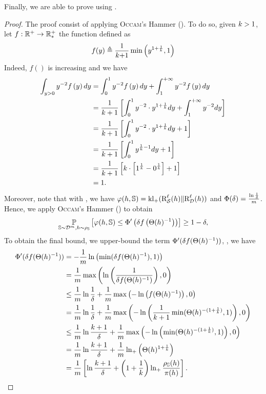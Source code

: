 \begin{noaddcontents}
Finally, we are able to prove  using .

\disintegratedblanchard*
\begin{proof}
The proof consist of applying \textsc{Occam}'s Hammer ().
To do so, given $k>1$, let $f: \mathbb{R}^{+} \to \mathbb{R}^{+}_{*}$ the function defined as
\begin{align*}
    f(y) \triangleq \frac{1}{k{+}1}\min\left( y^{1+\frac{1}{k}}, 1\right)
\end{align*}
Indeed, $f()$ is increasing and we have
\begin{align*}
\int_{y>0}y^{-2}f\left( y\right) dy &= \int_{0}^{1}y^{-2}f\left( y\right) dy + \int_{1}^{+\infty}y^{-2}f\left( y\right) dy\\
&= \frac{1}{k+1}\left[ \int_{0}^{1}y^{-2}\cdot y^{1+\frac{1}{k}} dy + \int_{1}^{+\infty} y^{-2}dy \right]\\
&= \frac{1}{k+1}\left[ \int_{0}^{1}y^{-2}\cdot y^{1+\frac{1}{k}} dy + 1 \right]\\
&= \frac{1}{k+1}\left[ \int_{0}^{1} y^{\frac{1}{k}-1} dy + 1 \right]\\
&= \frac{1}{k+1}\left[ k\cdot\left[1^{\frac{1}{k}}-0^{\frac{1}{k}}\right] + 1 \right]\\
&= 1.
\end{align*}
Moreover, note that with , we have $\varphi(h,\mathbb{S})=\operatorname{kl}_{+}(\text{R}^{\ell}_{\mathcal{S}}(h)\|\text{R}^{\ell}_{\mathcal{D}}(h))$ and $\Phi(\delta) = \frac{\ln\frac{1}{\delta}}{m}$.
Hence, we apply \textsc{Occam}'s Hammer () to obtain
    \begin{align*}
    \operatorname*{\mathbb{P}}_{\mathbb{S}\sim\mathcal{D}^m,h\sim\rho_{\mathbb{S}}}\left[ \varphi(h,\mathbb{S}) \le \Phi'\left(\delta f\left(\Theta(h)^{-1}\right)\right) \right] \ge 1-\delta,
\end{align*}
To obtain the final bound, we upper-bound the term $\Phi'(\delta f(\Theta(h)^{-1}))$, \ie, we have 
\begingroup
\allowdisplaybreaks
\begin{align*}
    \Phi'(\delta f(\Theta(h)^{-1})) &= -\frac{1}{m}\ln\left( \min(\delta f(\Theta(h)^{-1}), 1)\right)\\
    &= \frac{1}{m}\max\left(\ln\left(\frac{1}{\delta f(\Theta(h)^{-1})}\right), 0\right)\\
    &\le \frac{1}{m}\ln\frac{1}{\delta}+\frac{1}{m}\max\left( -\ln\left( f(\Theta(h)^{-1})\right), 0\right)\\
    &= \frac{1}{m}\ln\frac{1}{\delta}+\frac{1}{m}\max\left( -\ln\left( \frac{1}{k+1}\min(\Theta(h)^{-(1+\frac{1}{k})}, 1)\right), 0\right)\\
    &\le \frac{1}{m}\ln\frac{k+1}{\delta}+\frac{1}{m}\max\left( -\ln\left( \min(\Theta(h)^{-(1+\frac{1}{k})}, 1)\right), 0\right)\\
    &= \frac{1}{m}\ln\frac{k+1}{\delta}+\frac{1}{m}\ln_{+}\left(\Theta(h)^{1+\frac{1}{k}}\right)\\
    &= \frac{1}{m}\left[\ln\frac{k+1}{\delta}+\left(1+\frac{1}{k}\right)\ln_{+}\frac{\rho_{\mathbb{S}}(h)}{\pi(h)}\right].
\end{align*}
\endgroup
\end{proof}


\end{noaddcontents}
